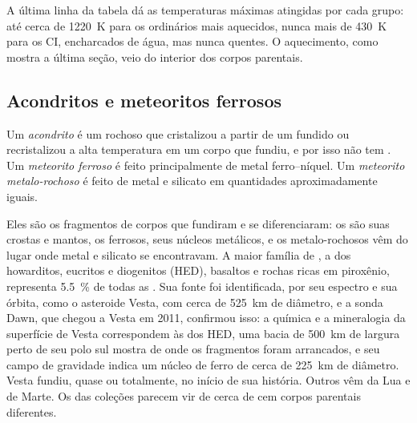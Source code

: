 A última linha da tabela dá as temperaturas máximas atingidas por cada grupo:
até cerca de \qty{1220}{K} para os  ordinários mais aquecidos, nunca mais
de \qty{430}{K} para os  CI, encharcados de água, mas nunca quentes. O
aquecimento, como mostra a última seção, veio do interior dos corpos parentais.

\subsection{Acondritos e meteoritos ferrosos}

\begin{definition}
\label{def:b2:planet-formation-meteorites:classes}
Um \emph{acondrito} é um  rochoso que cristalizou
a partir de um fundido ou recristalizou a alta temperatura em um corpo que fundiu, e
por isso não tem . Um \emph{meteorito ferroso} é feito
principalmente de metal ferro--níquel. Um \emph{meteorito
metalo-rochoso} é feito de metal e silicato em quantidades
aproximadamente iguais.
\end{definition}

Eles são os fragmentos de corpos que fundiram e se diferenciaram: os  são suas
crostas e mantos, os ferrosos, seus núcleos metálicos, e os metalo-rochosos vêm do lugar onde
metal e silicato se encontravam. A maior família de , a dos howarditos,
eucritos e diogenitos (HED), basaltos e rochas ricas em piroxênio, representa
\qty{5.5}{\percent} de todas as . Sua fonte foi identificada, por seu espectro e
sua órbita, como o asteroide Vesta, com cerca de \qty{525}{km} de diâmetro, e a sonda Dawn,
que chegou a Vesta em 2011, confirmou isso: a química
e a mineralogia da superfície de Vesta correspondem às dos  HED, uma bacia
de \qty{500}{km} de largura perto de seu polo sul mostra de onde os fragmentos foram
arrancados, e seu campo de gravidade indica um núcleo de ferro de cerca de \qty{225}{km} de diâmetro.
Vesta fundiu, quase ou totalmente, no início de sua história. Outros  vêm
da Lua e de Marte. Os  das coleções parecem vir
de cerca de cem corpos parentais diferentes.


